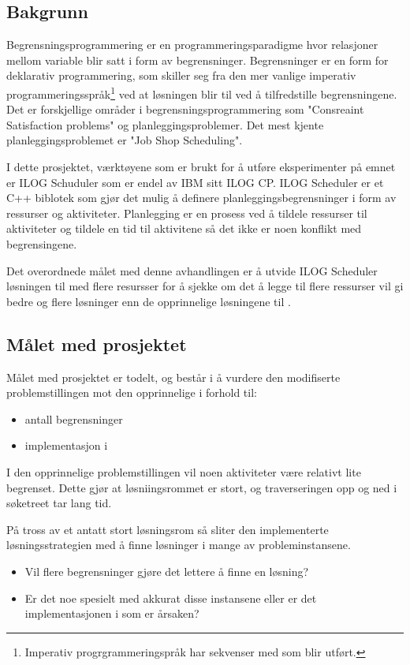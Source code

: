 \subsection{Bakgrunn}
Begrensningsprogrammering er en programmeringsparadigme hvor relasjoner mellom variable blir satt i form av begrensninger. Begrensninger er en form for deklarativ programmering, som skiller seg fra den mer vanlige imperativ programmeringsspråk\footnote{Imperativ progrgrammeringspråk har sekvenser med som blir utført.} ved at løsningen blir til ved å tilfredstille begrensningene. Det er forskjellige områder i begrensningsprogrammering som "Consreaint Satisfaction problems" og planleggingsproblemer. Det mest kjente planleggingsproblemet er "Job Shop Scheduling".\cite{cpwikipedia}

I dette prosjektet, værktøyene som er brukt for å utføre eksperimenter på emnet er ILOG Schuduler som er endel av IBM sitt ILOG CP. ILOG Scheduler er et C++ biblotek som gjør det mulig å definere planleggingsbegrensninger i form av ressurser og aktiviteter. Planlegging er en prosess ved å tildele ressurser til aktiviteter og tildele en tid til aktivitene så det ikke er noen konflikt med begrensingene.\cite{Pape94implementationof}

Det overordnede målet med denne avhandlingen er å utvide ILOG Scheduler løsningen til \bht med flere resursser for å sjekke om det å legge til flere ressurser vil gi bedre og flere løsninger enn de opprinnelige løsningene til \bht.

\subsection{Målet med prosjektet}
Målet med prosjektet er todelt, og består i å vurdere den modifiserte problemstillingen mot den opprinnelige i forhold til:
\begin{itemize}
\item antall begrensninger
\item implementasjon i \ilog
\end{itemize}

I den opprinnelige problemstillingen vil noen aktiviteter være relativt lite begrenset. Dette gjør at løsniingsrommet er stort, og traverseringen opp og ned i søketreet tar lang tid.

På tross av et antatt stort løsningsrom så sliter den \ilog implementerte løsningsstrategien med å finne løsninger i mange av probleminstansene.

\begin{itemize}
\item Vil flere begrensninger gjøre det lettere å finne en løsning?
\item Er det noe spesielt med akkurat disse instansene eller er det implementasjonen i \ilog som er årsaken?
\end{itemize}